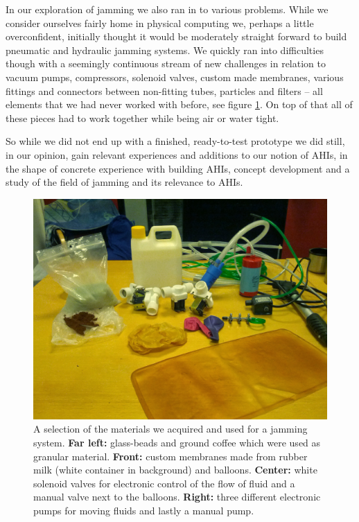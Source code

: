 In our exploration of jamming we also ran in to various problems.
While we consider ourselves fairly home in physical computing we, perhaps a little overconfident, initially thought it would be moderately straight forward to build pneumatic and hydraulic jamming systems.
We quickly ran into difficulties though with a seemingly continuous stream of new challenges in relation to vacuum pumps, compressors, solenoid valves, custom made membranes, various fittings and connectors between non-fitting tubes, particles and filters -- all elements that we had never worked with before, see figure \ref{fig:ch:jamming:materials}.
On top of that all of these pieces had to work together while being air or water tight. 

So while we did not end up with a finished, ready-to-test prototype we did still, in our opinion, gain relevant experiences and additions to our notion of AHIs, in the shape of concrete experience with building AHIs, concept development and a study of the field of jamming and its relevance to AHIs. 

\begin{figure}[h]
	\centering
	\includegraphics[width=.9\linewidth]{figures/jamming/jamming-materials}
	\caption{A selection of the materials we acquired and used for a jamming system. \textbf{Far left:} glass-beads and ground coffee which were used as granular material. \textbf{Front:} custom membranes made from rubber milk (white container in background) and balloons. \textbf{Center:} white solenoid valves for electronic control of the flow of fluid and a manual valve next to the balloons. \textbf{Right:} three different electronic pumps for moving fluids and lastly a manual pump.}
	\label{fig:ch:jamming:materials}
\end{figure}

